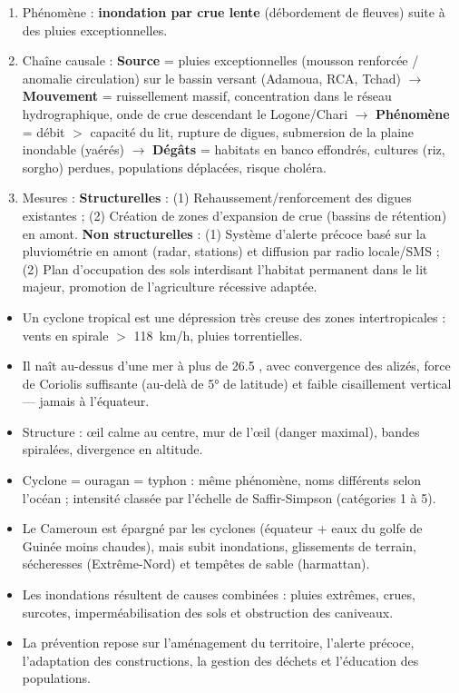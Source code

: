 \documentclass[11pt]{article}
\begin{document}
\begin{corrige}
\begin{enumerate}
\item Phénomène : \textbf{inondation par crue lente} (débordement de fleuves) suite à des pluies exceptionnelles.
\item Chaîne causale : \textbf{Source} = pluies exceptionnelles (mousson renforcée / anomalie circulation) sur le bassin versant (Adamoua, RCA, Tchad) $\rightarrow$ \textbf{Mouvement} = ruissellement massif, concentration dans le réseau hydrographique, onde de crue descendant le Logone/Chari $\rightarrow$ \textbf{Phénomène} = débit $>$ capacité du lit, rupture de digues, submersion de la plaine inondable (yaérés) $\rightarrow$ \textbf{Dégâts} = habitats en banco effondrés, cultures (riz, sorgho) perdues, populations déplacées, risque choléra.
\item Mesures : \textbf{Structurelles} : (1) Rehaussement/renforcement des digues existantes ; (2) Création de zones d'expansion de crue (bassins de rétention) en amont. \textbf{Non structurelles} : (1) Système d'alerte précoce basé sur la pluviométrie en amont (radar, stations) et diffusion par radio locale/SMS ; (2) Plan d'occupation des sols interdisant l'habitat permanent dans le lit majeur, promotion de l'agriculture récessive adaptée.
\end{enumerate}
\end{corrige}

\begin{aretenir}
\begin{itemize}
\item Un cyclone tropical est une dépression très creuse des zones intertropicales : vents en spirale $>$ \SI{118}{km/h}, pluies torrentielles.
\item Il naît au-dessus d'une mer à plus de \num{26,5} \textcelsius{}, avec convergence des alizés, force de Coriolis suffisante (au-delà de 5° de latitude) et faible cisaillement vertical — jamais à l'équateur.
\item Structure : œil calme au centre, mur de l'œil (danger maximal), bandes spiralées, divergence en altitude.
\item Cyclone = ouragan = typhon : même phénomène, noms différents selon l'océan ; intensité classée par l'échelle de Saffir-Simpson (catégories 1 à 5).
\item Le Cameroun est épargné par les cyclones (équateur + eaux du golfe de Guinée moins chaudes), mais subit inondations, glissements de terrain, sécheresses (Extrême-Nord) et tempêtes de sable (harmattan).
\item Les inondations résultent de causes combinées : pluies extrêmes, crues, surcotes, imperméabilisation des sols et obstruction des caniveaux.
\item La prévention repose sur l'aménagement du territoire, l'alerte précoce, l'adaptation des constructions, la gestion des déchets et l'éducation des populations.
\end{itemize}
\end{aretenir}
\end{document}
